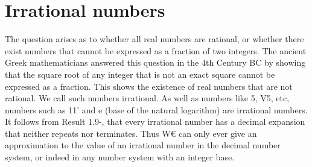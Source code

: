 \section{Irrational numbers}
The question arises as to whether all real numbers are rational, or whether there exist numbers that
cannot be expressed as a fraction of two integers. The ancient Greek mathematicians answered
this question in the 4th Century BC by showing that the square root of any integer that is not
an exact square cannot be expressed as a fraction. This shows the existence of real numbers that
are not rational. We call such numbers irrational. As well as numbers like \/5, V5, etc, numbers
such as 11' and e (base of the natural logarithm) are irrational numbers. It follows from Result 1.9-,
that every irrational number has a decimal expansion that neither repeats nor terminates. Thus
W€ can only ever give an approximation to the value of an irrational number in the decimal number
system, or indeed in any number system with an integer base.
